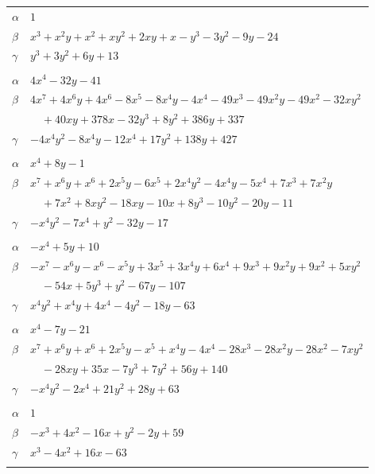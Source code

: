 \documentclass[11pt]{article}
\begin{document}
\begin{longtable}{@{}ll@{}}
$\alpha$ & $1$\\
$\beta$ & $x^{3}+x^{2}y+x^{2}+xy^{2}+2xy+x-y^{3}-3y^{2}-9y-24$\\
$\gamma$ & $y^{3}+3y^{2}+6y+13$\\
\addlinespace[3pt]
\multicolumn{2}{@{}l}{$\{i,j\}=\{8,21\}$, $k_{ij}=2\cdot 3^{3}\cdot 7$}\\
$\alpha$ & $4x^{4}-32y-41$\\
$\beta$ & $4x^{7}+4x^{6}y+4x^{6}-8x^{5}-8x^{4}y-4x^{4}-49x^{3}-49x^{2}y-49x^{2}-32xy^{2}$\\
 & $\quad +40xy+378x-32y^{3}+8y^{2}+386y+337$\\
$\gamma$ & $-4x^{4}y^{2}-8x^{4}y-12x^{4}+17y^{2}+138y+427$\\
\addlinespace[3pt]
\multicolumn{2}{@{}l}{$\{i,j\}=\{8,29\}$, $k_{ij}=2^{3}\cdot 3$}\\
$\alpha$ & $x^{4}+8y-1$\\
$\beta$ & $x^{7}+x^{6}y+x^{6}+2x^{5}y-6x^{5}+2x^{4}y^{2}-4x^{4}y-5x^{4}+7x^{3}+7x^{2}y$\\
 & $\quad +7x^{2}+8xy^{2}-18xy-10x+8y^{3}-10y^{2}-20y-11$\\
$\gamma$ & $-x^{4}y^{2}-7x^{4}+y^{2}-32y-17$\\
\addlinespace[3pt]
\multicolumn{2}{@{}l}{$\{i,j\}=\{8,34\}$, $k_{ij}=3^{2}$}\\
$\alpha$ & $-x^{4}+5y+10$\\
$\beta$ & $-x^{7}-x^{6}y-x^{6}-x^{5}y+3x^{5}+3x^{4}y+6x^{4}+9x^{3}+9x^{2}y+9x^{2}+5xy^{2}$\\
 & $\quad -54x+5y^{3}+y^{2}-67y-107$\\
$\gamma$ & $x^{4}y^{2}+x^{4}y+4x^{4}-4y^{2}-18y-63$\\
\addlinespace[3pt]
\multicolumn{2}{@{}l}{$\{i,j\}=\{8,36\}$, $k_{ij}=2^{5}\cdot 7$}\\
$\alpha$ & $x^{4}-7y-21$\\
$\beta$ & $x^{7}+x^{6}y+x^{6}+2x^{5}y-x^{5}+x^{4}y-4x^{4}-28x^{3}-28x^{2}y-28x^{2}-7xy^{2}$\\
 & $\quad -28xy+35x-7y^{3}+7y^{2}+56y+140$\\
$\gamma$ & $-x^{4}y^{2}-2x^{4}+21y^{2}+28y+63$\\
\addlinespace[3pt]
\multicolumn{2}{@{}l}{$\{i,j\}=\{9,14\}$, $k_{ij}=3^{5}$}\\
$\alpha$ & $1$\\
$\beta$ & $-x^{3}+4x^{2}-16x+y^{2}-2y+59$\\
$\gamma$ & $x^{3}-4x^{2}+16x-63$\\
\addlinespace[3pt]

\end{longtable}
\end{document}
